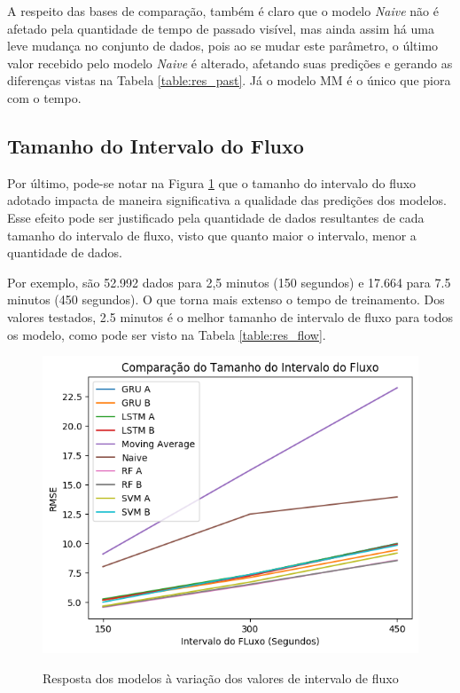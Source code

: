 A respeito das bases de comparação, também é claro que o modelo \textit{Naive} não é afetado pela quantidade de tempo de passado visível, mas ainda assim há uma leve mudança no conjunto de dados, pois ao se mudar este parâmetro, o último valor recebido pelo modelo \textit{Naive} é alterado, afetando suas predições e gerando as diferenças vistas na Tabela \ref{table:res_past}. Já o modelo \acrshort{MM} é o único que piora com o tempo. 
\subsection{Tamanho do Intervalo do Fluxo}

Por último, pode-se notar na Figura \ref{figure:res_flow} que o tamanho do intervalo do fluxo adotado impacta de maneira significativa a qualidade das predições dos modelos. Esse efeito pode ser justificado pela quantidade de dados resultantes de cada tamanho do intervalo de fluxo, visto que quanto maior o intervalo, menor a quantidade de dados. 

Por exemplo, são 52.992 dados para 2,5 minutos (150 segundos) e 17.664 para 7.5 minutos (450 segundos). O que torna mais extenso o tempo de treinamento. Dos valores testados, 2.5 minutos é o melhor tamanho de intervalo de fluxo para todos os modelo, como pode ser visto na Tabela \ref{table:res_flow}.

\begin{figure}[H]
    \centering
    \includegraphics[scale=0.9]{monography/img/comparisons/comparacao_do_tamanho_do_intervalo_do_fluxo_rmse.png}
    \label{figure:res_flow}
    \caption{Resposta dos modelos à variação dos valores de intervalo de fluxo}
\end{figure}


